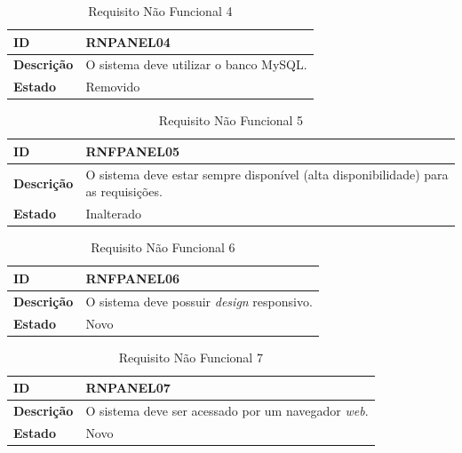 \begin{table}[H]
\centering
\begin{tabular}{|l|p{12cm}|}
\hline
\textbf{ID} & RNPANEL04 \\
\hline
\textbf{Descrição} & O sistema deve utilizar o banco MySQL. \\
\hline
\textbf{Estado} & Removido \\
\hline
\end{tabular}
\caption[RNPANEL04 -- Uso do banco MySQL]{Requisito Não Funcional 4}
\label{tab:rnfpanel04}
\end{table}

\begin{table}[H]
\centering
\begin{tabular}{|l|p{12cm}|}
\hline
\textbf{ID} & RNFPANEL05 \\
\hline
\textbf{Descrição} & O sistema deve estar sempre disponível (alta disponibilidade) para as requisições. \\
\hline
\textbf{Estado} & Inalterado \\
\hline
\end{tabular}
\caption[RNFPANEL05 -- Alta disponibilidade]{Requisito Não Funcional 5}
\label{tab:rnfpanel05}
\end{table}

\begin{table}[H]
\centering
\begin{tabular}{|l|p{12cm}|}
\hline
\textbf{ID} & RNFPANEL06 \\
\hline
\textbf{Descrição} & O sistema deve possuir \emph{design} responsivo. \\
\hline
\textbf{Estado} & Novo \\
\hline
\end{tabular}
\caption[RNFPANEL06 -- Design responsivo]{Requisito Não Funcional 6}
\label{tab:rnfpanel06}
\end{table}

\begin{table}[H]
\centering
\begin{tabular}{|l|p{12cm}|}
\hline
\textbf{ID} & RNPANEL07 \\
\hline
\textbf{Descrição} & O sistema deve ser acessado por um navegador \emph{web}. \\
\hline
\textbf{Estado} & Novo \\
\hline
\end{tabular}
\caption[RNPANEL07 -- Acesso por navegador web]{Requisito Não Funcional 7}
\label{tab:rnfpanel07}
\end{table}

